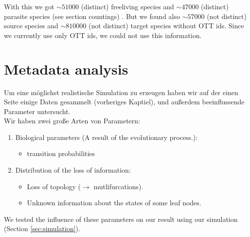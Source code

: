       With this we got $\sim 51000$ (distinct) freeliving species and $\sim 47000$ (distinct) parasite 
        species (see section countings) . But we found also  $\sim 57000$ (not 
        distinct) source species and $\sim 810000$ (not distinct) target species without OTT ids. 
        Since we currently use only OTT ids, we could not use this information. \\

  \section{Metadata analysis}
    Um eine möglichst realistische Simulation zu erzeugen haben wir auf der einen Seite einige Daten 
      gesammelt (vorheriges Kaptiel), und außerdem beeinflussende Parameter untersucht. \\
    Wir haben zwei große Arten von Parametern:
    \begin{enumerate}
      \item Biological parameters (A result of the evolutionary process.):
        \begin{itemize}
          \item transition probabilities
        \end{itemize}
      \item Distribution of the loss of information:
        \begin{itemize}
          \item Loss of topology ($\rightarrow$ mutlifurcations).
          \item Unknown information about the states of some leaf nodes.
        \end{itemize}
    \end{enumerate}
    We tested the influence of these parameters on our result using our simulation (Section 
      \ref{sec:simulation}).
   
